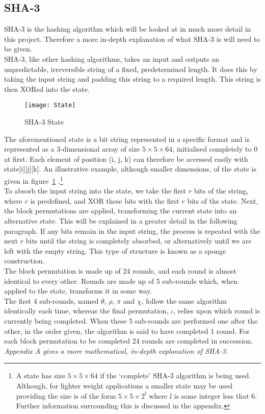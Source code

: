 \subsection{SHA-3}
SHA-3 is the hashing algorithm which will be looked at in much more detail in this project. Therefore a more in-depth explanation of what SHA-3 is will need to be given.
\vspace{5 mm}\\
SHA-3, like other hashing algorithms, takes an input and outputs an unpredictable, irreversible string of a fixed, predetermined length. It does this by taking the input string and padding this string to a required length. This string is then XORed into the state.

\begin{figure}[h]
\label{fig:stateFigure}
\texttt{[image: State]}
\centering
\caption{SHA-3 State}
\end{figure}
\noindent The aforementioned state is a bit string represented in a specific format and is represented as a 3-dimensional array of size $5 \times 5 \times 64$, initialised completely to 0 at first. Each element of position (i, j, k) can therefore be accessed easily with state[i][j][k]. An illustrative example, although smaller dimensions, of the state is given in figure~\ref{fig:stateFigure} \cite{KeccakSite}.\footnote{A state has size $ 5 \times 5 \times 64 $ if the `complete' SHA-3 algorithm is being used. Although, for lighter weight applications a smaller state may be used providing the size is of the form $5 \times 5 \times 2^{l}$ where $l$ is some integer less that $6$. Further information surrounding this is discussed in the appendix.}
\vspace{5 mm}\\
To absorb the input string into the state, we take the first $r$ bits of the string, where $r$ is predefined, and XOR these bits with the first $r$ bits of the state. Next, the block permutations are applied, transforming the current state into an alternative state. This will be explained in a greater detail in the following paragraph. If any bits remain in the input string, the process is repeated with the next $r$ bits until the string is completely absorbed, or alternatively until we are left with the empty string. This type of structure is known as a sponge construction.
\vspace{5 mm}\\
The block permutation is made up of 24 rounds, and each round is almost identical to every other. Rounds are made up of 5 sub-rounds which, when applied to the state, transforms it in some way.
\vspace{5 mm}\\
The first 4 sub-rounds, named $\theta$, $\rho$, $\pi$ and $\chi$, follow the same algorithm identically each time, whereas the final permutation, $\iota$, relies upon which round is currently being completed. When these 5 sub-rounds are performed one after the other, in the order given, the algorithm is said to have completed 1 round. For each block permutation to be completed 24 rounds are completed in succession.
\vspace{5 mm}\\
\textit{Appendix A gives a more mathematical, in-depth explanation of SHA-3.}
